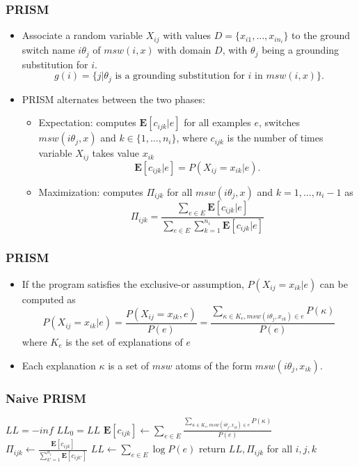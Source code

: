 \documentclass[trans,aspectratio=1610]{beamer}
\newcommand{\defpprog}{\ensuremath{\mathcal{P}}\xspace}
\begin{document}
\begin{frame}
  \frametitle{PRISM}
\begin{itemize}
\item Associate a random variable $X_{ij}$ with values $D=\{x_{i1},\ldots,x_{in_i}\}$ to the ground switch name $i\theta_j$  of $msw(i,x)$ with domain $D$, with $\theta_j$ being a grounding
substitution for $i$. 
$$g(i)=\{j|\theta_j \mbox{ is a grounding substitution for $i$ in } msw(i,x) \}.$$
\item PRISM alternates between the two phases:
\begin{itemize}
\item 
Expectation:
computes $\mathbf{E}[c_{ijk}|e]$ for all examples $e$, switches $msw(i\theta_j,x)$ and $k\in\{1,\ldots,n_i\}$, where $c_{ijk}$ is the number of times  variable $X_{ij}$ takes value $x_{ik}$
$$\mathbf{E}[c_{ijk}|e]=P(X_{ij}=x_{ik}|e).$$
\item
Maximization: computes $\Pi_{ijk}$ for all $msw(i\theta_j,x)$ and $k=1,\ldots,n_i-1$ as
$$\Pi_{ijk}=\frac{\sum_{e\in E}\mathbf{E}[c_{ijk}|e]}{\sum_{e\in E}\sum_{k=1}^{n_i}\mathbf{E}[c_{ijk}|e]}$$
\end{itemize}
\end{itemize}
\end{frame}
\begin{frame}
  \frametitle{PRISM}
\begin{itemize}
\item
If the program satisfies the exclusive-or
assumption, $P(X_{ij}=x_{ik}|e)$ can be computed as
$$P(X_{ij}=x_{ik}|e)=\frac{P(X_{ij}=x_{ik},e)}{P(e)}=
\frac{\sum_{\kappa\in K_e,msw(i\theta_j,x_{ik})\in e}P(\kappa)}{P(e)}$$
where $K_e$ is the set of explanations of $e$ 
\item Each explanation $\kappa$ is a set of 
$msw$ atoms of the form $msw(i\theta_j,x_{ik})$.
\end{itemize}
\end{frame}
\begin{frame}
  \frametitle{Naive PRISM}
\begin{algorithmic}[1]
\Function{PRISM-EM-Naive}{$E,\defpprog,\epsilon$}
\State $LL=-\mathit{inf}$
\Repeat
  \State $LL_0=LL$
    \State $\mathbf{E}[c_{ijk}]\gets \sum_{e\in E}\frac{\sum_{\kappa\in K_e,msw(i\theta_j,x_{ik})\in e}P(\kappa)}{P(e)}$
  \EndFor
    \State $\Pi_{ijk}\gets \frac{ \mathbf{E}[c_{ijk}]}{\sum_{k'=1}^{n_i}\mathbf{E}[c_{ijk'}]}$
  \EndFor
  \State $LL\gets \sum_{e\in E}\log P(e)$
\State return $LL,\Pi_{ijk}$ for all $i,j,k$
\EndFunction
\end{algorithmic}

\end{frame}
\end{document}
